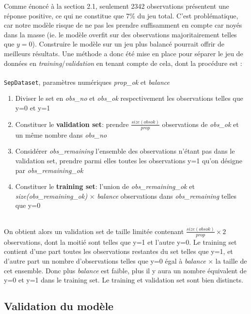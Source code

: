 \documentclass[]{article}
\begin{document}
Comme énoncé à la section 2.1, seulement 2342 observations présentent une réponse positive, ce qui ne constitue que 7\% du jeu total. C'est problématique, car notre modèle risque de ne pas les prendre suffisamment en compte car noyés dans la masse (ie. le modèle overfit sur des observations majoritairement telles que $y=0$). Construire le modèle sur un jeu plus balancé pourrait offrir de meilleurs résultats. Une méthode a donc été mise en place pour séparer le jeu de données en \textit{training}/\textit{validation} en tenant compte de cela, dont la procédure est :\\
~\\
\indent \texttt{SepDataset}, paramètres numériques \textit{prop\_ok} et \textit{balance}  
\begin{enumerate}
\item Diviser le set en \textit{obs\_no} et \textit{obs\_ok} respectivement les observations telles que y=0 et y=1 
\item Constituer le \textbf{validation set}: prendre $\frac{size(obsok)}{prop}$ observations de \textit{obs\_ok} et un même nombre dans \textit{obs\_no}
\item Considérer \textit{obs\_remaining} l'ensemble des observations n'étant pas dans le validation set, prendre parmi elles toutes les observations y=1 qu'on désigne par \textit{obs\_remaining\_ok} 
\item Constituer le \textbf{training set}: l'union de \textit{obs\_remaining\_ok} et \textit{size(\textit{obs\_remaining\_ok})} $\times$ \textit{balance} observations dans \textit{obs\_remaining} telles que y=0
\end{enumerate}
~\\
On obtient alors un validation set de taille limitée contenant $\frac{size(obsok)}{prop} \times 2$ observations, dont la moitié sont telles que y=1 et l'autre y=0. Le training set contient d'une part toutes les observations restantes du set telles que y=1, et d'autre part un nombre d'observations telles que y=0 égal à \textit{balance} $\times$ la taille de cet ensemble. Donc plus \textit{balance} est faible, plus il y aura un nombre équivalent de y=0 et y=1 dans le training set. Le training et validation set sont bien distincts.

\subsection{Validation du modèle}
\end{document}
